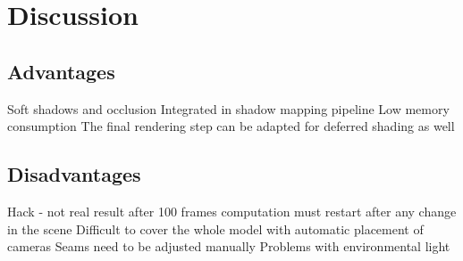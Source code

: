 \section{Discussion}
\subsection{Advantages}
Soft shadows and occlusion
Integrated in shadow mapping pipeline
Low memory consumption
The final rendering step can be adapted for deferred shading as well


\subsection{Disadvantages}
Hack - not real result after 100 frames
computation must restart after any change in the scene
Difficult to cover the whole model with automatic placement of cameras
Seams need to be adjusted manually
Problems with environmental light

